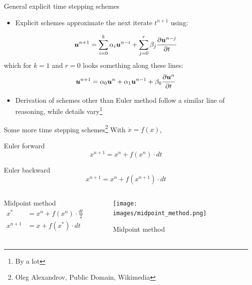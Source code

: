 \documentclass[presentation]{beamer}
\newcommand{\gv}[1]{\ensuremath{\mbox{\boldmath$ #1 $}}}
\begin{document}
\begin{frame}[label={sec:orgf7cedd2}]{General explicit time stepping schemes}
\begin{itemize}
\item Explicit schemes approximate the next iterate \(t^{n+1}\) using:
\end{itemize}
\[ \gv{u}^{n+1} = \sum_{i=0}^{k} \alpha_i \gv{u}^{n-i} + \sum_{j=0}^{r} \beta_j \frac{\partial \gv{u}^{n-j}}{\partial t} \]
  which for \(k=1\) and \(r=0\) looks something along these lines:
\[ \gv{u}^{n+1} = \alpha_0 \gv{u}^{n} + \alpha_1 \gv{u}^{n-1} + \beta_0 \frac{\partial \gv{u}^{n}}{\partial t} \]
\begin{itemize}
\item Derivation of schemes other than Euler method follow a similar line of reasoning, while
details vary\footnote{By a \alert{lot}}
\end{itemize}
\end{frame}
\begin{frame}[label={sec:orgde674a9}]{Some more time stepping schemes\footnote{Oleg Alexandrov, Public Domain, Wikimedia}}
With \(\dot{x} = f(x)\),
\begin{block}{Euler forward}
\[ x^{n+1} = x^{n} + f(x^{n}) \cdot dt \]
\end{block}
\begin{block}{Euler backward}
\[ x^{n+1} = x^{n} + f(x^{n+1}) \cdot dt \]
\end{block}
\begin{columns}
\begin{column}{0.5\columnwidth}
\begin{block}{Midpoint method}
\begin{equation*}
\begin{aligned}
x^{*}&= x^{n} + f({x}^{n}) \cdot \frac{dt}{2} \\
x^{n+1} &= x + f({x}^{*}) \cdot dt \\
\end{aligned}
\end{equation*}
\end{block}
\end{column}
\begin{column}{0.4\columnwidth}
\begin{figure}[htbp]
\centering
\texttt{[image: images/midpoint\_method.png]}
\caption{Midpoint method}
\end{figure}
\end{column}
\end{columns}
\end{frame}
\end{document}
